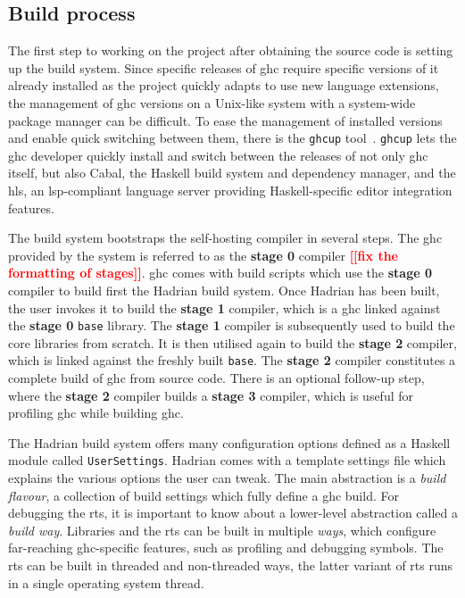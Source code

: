 \documentclass[thesis=B,english]{FITthesis}[2019/12/23]
\newcommand{\todo}[1]{\textcolor{red}{\textbf{[[#1]]}}}
\newcommand{\hackage}[1]{\texttt{#1}}
\newcommand{\hsModule}[1]{\texttt{#1}}
\begin{document}
\subsection*{Build process}
The first step to working on the project after obtaining the source code is
setting up the build system. Since specific releases of \acrshort{ghc} require
specific versions of it already installed as the project quickly adapts to use
new language extensions, the management of \acrshort{ghc} versions on a
Unix-like system with a system-wide package manager can be difficult. To ease
the management of installed versions and enable quick switching between them,
there is the \texttt{ghcup} tool~\cite{ghcup}. \texttt{ghcup} lets the
\acrshort{ghc} developer quickly install and switch between the releases of not
only \acrshort{ghc} itself, but also Cabal, the Haskell build system and
dependency manager, and the \acrfull{hls}, an \acrshort{lsp}-compliant language
server providing Haskell-specific editor integration features.

The build system bootstraps the self-hosting compiler in several steps. The
\acrshort{ghc} provided by the system is referred to as the \textbf{stage 0}
compiler \todo{fix the formatting of stages}. \acrshort{ghc} comes with build
scripts which use the \textbf{stage 0} compiler to build first the Hadrian
build system. Once Hadrian has been built, the user invokes it to build the
\textbf{stage 1} compiler, which is a \acrshort{ghc} linked against the
\textbf{stage 0} \hackage{base} library. The \textbf{stage 1} compiler is
subsequently used to build the core libraries from scratch. It is then utilised
again to build the \textbf{stage 2} compiler, which is linked against the
freshly built \hackage{base}. The \textbf{stage 2} compiler constitutes a
complete build of \acrshort{ghc} from source code. There is an optional
follow-up step, where the \textbf{stage 2} compiler builds a \textbf{stage 3}
compiler, which is useful for profiling \acrshort{ghc} while building
\acrshort{ghc}.

The Hadrian build system offers many configuration options defined as a Haskell
module called \hsModule{UserSettings}. Hadrian comes with a template settings
file which explains the various options the user can tweak. The main
abstraction is a \textit{build flavour}, a collection of build settings which
fully define a \acrshort{ghc} build. For debugging the \acrshort{rts}, it is
important to know about a lower-level abstraction called a \textit{build way}.
Libraries and the \acrshort{rts} can be built in multiple \textit{ways}, which
configure far-reaching \acrshort{ghc}-specific features, such as profiling and
debugging symbols. The \acrshort{rts} can be built in threaded and non-threaded
ways, the latter variant of \acrshort{rts} runs in a single operating system
thread.
\end{document}
